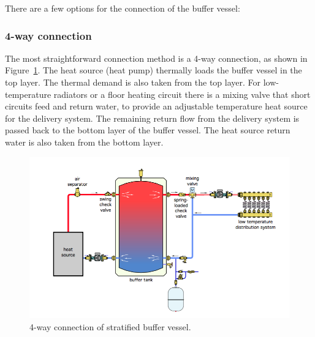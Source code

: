 There are a few options for the connection of the buffer vessel:

\subsubsection{4-way connection}

The most straightforward connection method is a 4-way connection, as shown in Figure~\ref{fig:4way}. The heat source (heat pump) thermally loads the buffer vessel in the top layer. The thermal demand is also taken from the top layer. For low-temperature radiators or a floor heating circuit there is a mixing valve that short circuits feed and return water, to provide an adjustable temperature heat source for the delivery system. The remaining return flow from the delivery system is passed back to the bottom layer of the buffer vessel. The heat source return water is also taken from the bottom layer.

\begin{figure}[H]
	\centering
	\includegraphics[width=0.7\columnwidth]{Figures/4-way buffer connection}
	\caption[Short title]{4-way connection of stratified buffer vessel.}
	\label{fig:4way}
\end{figure} 

